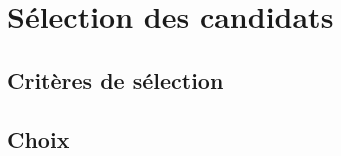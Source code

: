 
\chapter{Sélection des candidats}
\label{ch:selection}

\section{Critères de sélection}
\section{Choix}